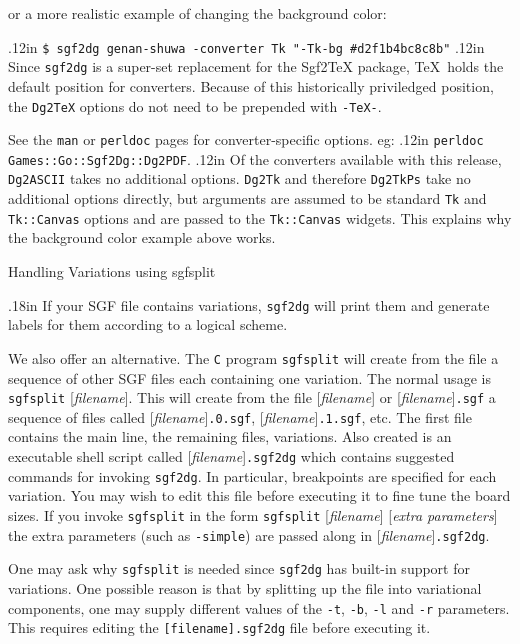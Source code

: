 \noindent
or a more realistic example of changing the background color:

\vglue.12in
    {\tt \$ sgf2dg genan-shuwa -converter Tk "-Tk-bg \#d2f1b4bc8c8b"}
\vglue.12in
Since {\tt sgf2dg} is a super-set replacement for the Sgf2TeX package,
\TeX\ holds the default position for converters.  Because of this
historically priviledged position, the {\tt Dg2TeX} options do not need to
be prepended with {\tt -TeX-}.

See the {\tt man} or {\tt perldoc} pages for converter-specific
options.  eg:
\vglue.12in
    {\tt perldoc Games::Go::Sgf2Dg::Dg2PDF}.
\vglue.12in
Of the converters available with this release, {\tt Dg2ASCII} takes
no additional options.  {\tt Dg2Tk} and therefore {\tt Dg2TkPs} take
no additional options directly, but arguments are assumed to be
standard {\tt Tk} and {\tt Tk::Canvas} options and are passed to
the {\tt Tk::Canvas} widgets.  This explains why the background
color example above works.

\vfil\eject
\centerline{\titlefont Handling Variations using {\titlett sgfsplit}}
\vglue.18in
If your SGF file contains variations, {\tt sgf2dg} will print them
and generate labels for them according to a logical scheme.

We also offer an alternative. The {\tt C} program {\tt sgfsplit} will 
create from the file a sequence of other SGF files each containing
one variation. The normal usage is {\tt sgfsplit} [{\it filename}]. This will
create from the file [{\it filename}] or [{\it filename}]{\tt .sgf} a sequence of
files called [{\it filename}]{\tt .0.sgf}, [{\it filename}]{\tt .1.sgf}, etc. The first
file contains the main line, the remaining files, variations. Also
created is an executable shell script called [{\it filename}]{\tt .sgf2dg}
which contains suggested commands for invoking {\tt sgf2dg}. In particular,
breakpoints are specified for each variation. You may wish to edit this file
before executing it to fine tune the board sizes. If you invoke {\tt sgfsplit}
in the form {\tt sgfsplit} [{\it filename}] [{\it extra parameters}] the
extra parameters (such as {\tt -simple}) are passed along in 
[{\it filename}]{\tt .sgf2dg}.

One may ask why {\tt sgfsplit} is needed since {\tt sgf2dg} has built-in
support for variations. One possible reason is that by splitting up the
file into variational components, one may supply different values of
the {\tt -t}, {\tt -b}, {\tt -l} and {\tt -r} parameters. This requires
editing the {\tt [filename].sgf2dg} file before executing it.


